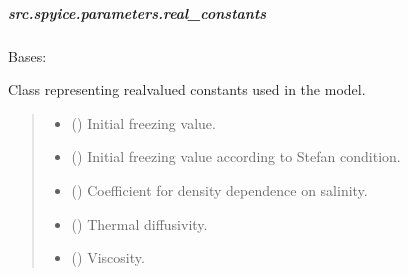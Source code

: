\documentclass[a4paper,11pt,english,openany]{sphinxmanual}
\begin{document}
\subparagraph{src.spyice.parameters.real\_constants}
\label{\detokenize{api/spyice.parameters.real_constants:module-src.spyice.parameters.real_constants}}\label{\detokenize{api/spyice.parameters.real_constants:src-spyice-parameters-real-constants}}\label{\detokenize{api/spyice.parameters.real_constants::doc}}

\begin{fulllineitems}
\label{\detokenize{api/spyice.parameters.real_constants:src.spyice.parameters.real_constants.RealConstants}}
\pysigstartsignatures
\pysigline
{}
\pysigstopsignatures
\sphinxAtStartPar
Bases: 

\sphinxAtStartPar
Class representing real\sphinxhyphen{}valued constants used in the model.
\begin{quote}\begin{description}
\begin{itemize}
\item {} 
\sphinxAtStartPar
{} () \textendash{} Initial freezing value.

\item {} 
\sphinxAtStartPar
{} () \textendash{} Initial freezing value according to Stefan condition.

\item {} 
\sphinxAtStartPar
{} () \textendash{} Coefficient for density dependence on salinity.

\item {} 
\sphinxAtStartPar
{} () \textendash{} Thermal diffusivity.

\item {} 
\sphinxAtStartPar
{} () \textendash{} Viscosity.


\end{itemize}
\end{description}
\end{quote}
\end{fulllineitems}
\end{document}
